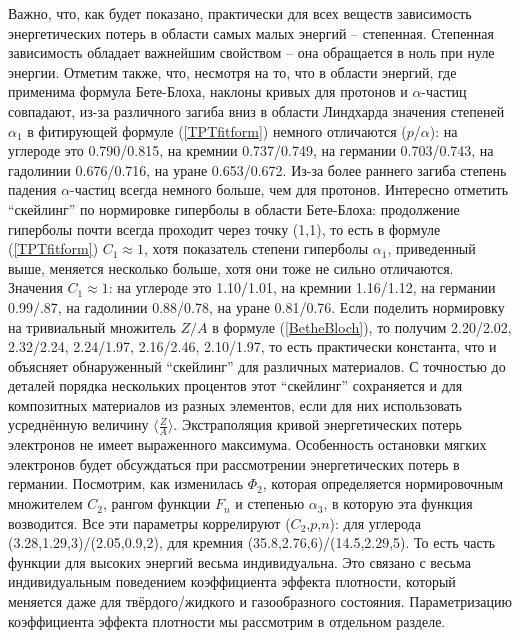 \documentclass[a4paper,12pt]{article}
\begin{document}
\begin{large}
  Важно, что, как будет показано, практически для всех веществ зависимость энергетических потерь в области самых малых энергий -- степенная.
  Степенная зависимость обладает важнейшим свойством -- она обращается в ноль при нуле энергии.
  Отметим также, что, несмотря на то, что в области энергий, где применима формула Бете-Блоха, наклоны кривых для протонов и $\alpha$-частиц совпадают, из-за различного загиба вниз в области Линдхарда значения степеней $\alpha_1$ в фитирующей формуле (\ref{TPTfitform}) немного отличаются ($p$/$\alpha$): на углероде это 0.790/0.815, на кремнии 0.737/0.749, на германии 0.703/0.743, на гадолинии 0.676/0.716, на уране 0.653/0.672.
  Из-за более раннего загиба степень падения $\alpha$-частиц всегда немного больше, чем для протонов.
  Интересно отметить ``скейлинг'' по нормировке гиперболы в области Бете-Блоха: продолжение гиперболы почти всегда проходит через точку (1,1), то есть в формуле (\ref{TPTfitform}) $C_1\approx 1$, хотя показатель степени гиперболы $\alpha_1$, приведенный выше, меняется несколько больше, хотя они тоже не сильно отличаются.
  Значения $C_1\approx 1$: на углероде это 1.10/1.01, на кремнии 1.16/1.12, на германии 0.99/.87, на гадолинии 0.88/0.78, на уране 0.81/0.76.
  Если поделить нормировку на тривиальный множитель $Z/A$ в формуле (\ref{BetheBloch}), то получим 2.20/2.02, 2.32/2.24, 2.24/1.97, 2.16/2.46, 2.10/1.97, то есть практически константа, что и объясняет обнаруженный ``скейлинг'' для различных материалов.
  С точностью до деталей порядка нескольких процентов этот ``скейлинг'' сохраняется и для композитных материалов из разных элементов, если для них использовать усреднённую величину $\langle\frac{Z}{A}\rangle$.
  Экстраполяция кривой энергетических потерь электронов не имеет выраженного максимума.
  Особенность остановки мягких электронов будет обсуждаться при рассмотрении энергетических потерь в германии.
  Посмотрим, как изменилась $\Phi_2$, которая определяется нормировочным множителем $C_2$, рангом функции $F_n$ и степенью $\alpha_3$, в которую эта функция возводится.
  Все эти параметры коррелируют ($C_2$,$p$,$n$): для углерода (3.28,1.29,3)/(2.05,0.9,2), для кремния (35.8,2.76,6)/(14.5,2.29,5).
  То есть часть функции для высоких энергий весьма индивидуальна.
  Это связано с весьма индивидуальным поведением коэффициента эффекта плотности, который меняется даже для твёрдого/жидкого и газообразного состояния.
  Параметризацию коэффициента эффекта плотности мы рассмотрим в отдельном разделе.
  

\end{large}
\end{document}
